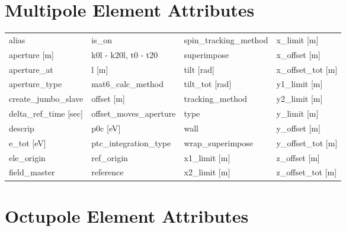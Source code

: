  \section{Multipole Element Attributes}
 \label{s:list.multipole}
 
 \begin{tabular}{llll} \toprule
alias                            & is_on                            & spin_tracking_method             & x_limit [m]                      \\
aperture [m]                     & k0l - k20l, t0 - t20             & superimpose                      & x_offset [m]                     \\
aperture_at                      & l [m]                            & tilt [rad]                       & x_offset_tot [m]                 \\
aperture_type                    & mat6_calc_method                 & tilt_tot [rad]                   & y1_limit [m]                     \\
create_jumbo_slave               & offset [m]                       & tracking_method                  & y2_limit [m]                     \\
delta_ref_time [sec]             & offset_moves_aperture            & type                             & y_limit [m]                      \\
descrip                          & p0c [eV]                         & wall                             & y_offset [m]                     \\
e_tot [eV]                       & ptc_integration_type             & wrap_superimpose                 & y_offset_tot [m]                 \\
ele_origin                       & ref_origin                       & x1_limit [m]                     & z_offset [m]                     \\
field_master                     & reference                        & x2_limit [m]                     & z_offset_tot [m]                 \\
 \bottomrule
 \end{tabular}
 \vfill
 
 \section{Octupole Element Attributes}
 \label{s:list.octupole}
 
